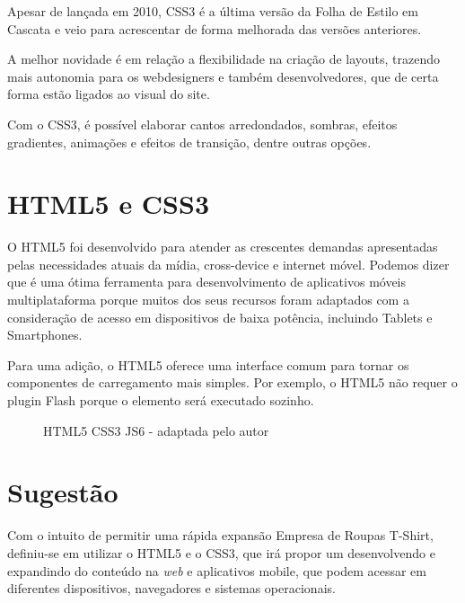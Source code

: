 Apesar de lançada em 2010, CSS3 é a última versão da Folha de Estilo em Cascata e veio para acrescentar de forma melhorada das versões anteriores.

A melhor novidade é em relação a flexibilidade na criação de layouts, trazendo mais autonomia para os webdesigners e também desenvolvedores, que de certa forma estão ligados ao visual do site.

Com o CSS3, é possível elaborar cantos arredondados, sombras, efeitos gradientes, animações e efeitos de transição, dentre outras opções.

\section{HTML5 e CSS3}

O HTML5 foi desenvolvido para atender as crescentes demandas apresentadas pelas necessidades atuais da mídia, cross-device e internet móvel. Podemos dizer que é uma ótima ferramenta para desenvolvimento de aplicativos móveis multiplataforma porque muitos dos seus recursos foram adaptados com a consideração de acesso em dispositivos de baixa potência, incluindo Tablets e Smartphones.

Para uma adição, o HTML5 oferece uma interface comum para tornar os componentes de carregamento mais simples. Por exemplo, o HTML5 não requer o plugin Flash porque o elemento será executado sozinho.

\begin{figure}[!htb]
    \centering
    \begin{minipage}{\wd0}
        \caption{HTML5 CSS3 JS6 - adaptada pelo autor}
    \end{minipage}
\end{figure}

\section{Sugestão}

Com o intuito de permitir uma rápida expansão Empresa de Roupas T-Shirt, definiu-se em utilizar o HTML5 e o CSS3, que irá propor um desenvolvendo e expandindo do conteúdo na \textit{web} e aplicativos mobile, que podem acessar em diferentes dispositivos, navegadores e sistemas operacionais.

